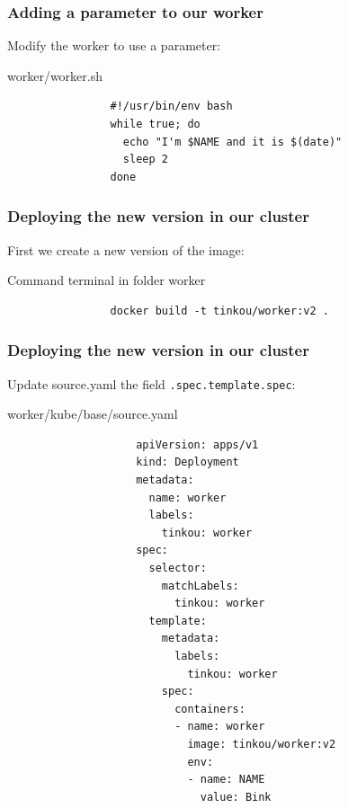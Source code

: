 	\begin{frame}[fragile]
		\frametitle{Adding a parameter to our worker}
		
		Modify the worker to use a parameter:
		\begin{block}{worker/worker.sh}
			\begin{verbatim}
				#!/usr/bin/env bash
				while true; do
				  echo "I'm $NAME and it is $(date)"
				  sleep 2
				done
			\end{verbatim}
		\end{block}
	\end{frame}
	
	\begin{frame}[fragile]
		\frametitle{Deploying the new version in our cluster}
		
		First we create a new version of the image:
		\begin{block}{Command terminal in folder worker}
			\begin{verbatim}
				docker build -t tinkou/worker:v2 .
			\end{verbatim}
		\end{block}
	\end{frame}
	
	\begin{frame}[fragile]
		\frametitle{Deploying the new version in our cluster}
		
		Update source.yaml the field \verb!.spec.template.spec!:
		\begin{block}{worker/kube/base/source.yaml}
			\begin{tiny}
				\begin{verbatim}
					apiVersion: apps/v1
					kind: Deployment
					metadata:
					  name: worker
					  labels:
					    tinkou: worker
					spec:
					  selector:
					    matchLabels:
					      tinkou: worker
					  template:
					    metadata:
					      labels:
					        tinkou: worker
					    spec:
					      containers:
					      - name: worker
					        image: tinkou/worker:v2
					        env:
					        - name: NAME
					          value: Bink
				\end{verbatim}
			\end{tiny}
		\end{block}
	\end{frame}
	
